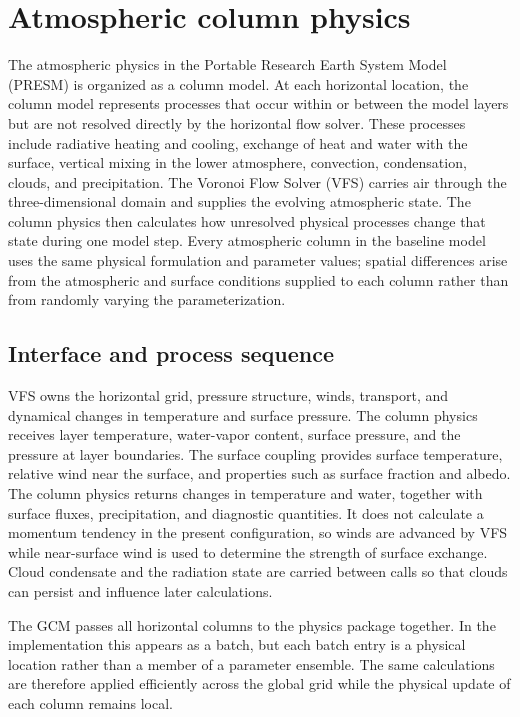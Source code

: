 
\section{Atmospheric column physics}
\label{sec:column}

The atmospheric physics in the Portable Research Earth System Model (PRESM) is organized as a column model.  At each horizontal location, the column model represents processes that occur within or between the model layers but are not resolved directly by the horizontal flow solver.  These processes include radiative heating and cooling, exchange of heat and water with the surface, vertical mixing in the lower atmosphere, convection, condensation, clouds, and precipitation.  The Voronoi Flow Solver (VFS) carries air through the three-dimensional domain and supplies the evolving atmospheric state.  The column physics then calculates how unresolved physical processes change that state during one model step.  Every atmospheric column in the baseline model uses the same physical formulation and parameter values; spatial differences arise from the atmospheric and surface conditions supplied to each column rather than from randomly varying the parameterization.

\subsection{Interface and process sequence}

VFS owns the horizontal grid, pressure structure, winds, transport, and dynamical changes in temperature and surface pressure.  The column physics receives layer temperature, water-vapor content, surface pressure, and the pressure at layer boundaries.  The surface coupling provides surface temperature, relative wind near the surface, and properties such as surface fraction and albedo.  The column physics returns changes in temperature and water, together with surface fluxes, precipitation, and diagnostic quantities.  It does not calculate a momentum tendency in the present configuration, so winds are advanced by VFS while near-surface wind is used to determine the strength of surface exchange.  Cloud condensate and the radiation state are carried between calls so that clouds can persist and influence later calculations.

The GCM passes all horizontal columns to the physics package together.  In the implementation this appears as a batch, but each batch entry is a physical location rather than a member of a parameter ensemble.  The same calculations are therefore applied efficiently across the global grid while the physical update of each column remains local.

